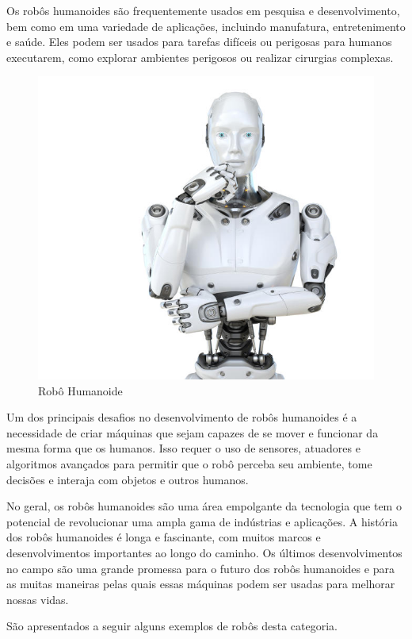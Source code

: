 \documentclass{report}
\begin{document}
Os robôs humanoides são frequentemente usados em pesquisa e desenvolvimento, bem como em uma variedade de aplicações, incluindo manufatura, entretenimento e saúde. Eles podem ser usados para tarefas difíceis ou perigosas para humanos executarem, como explorar ambientes perigosos ou realizar cirurgias complexas.

\begin{figure}
\includegraphics[width=0.9\linewidth]{robo.png} 
\caption{Robô Humanoide}
\label{robohumanoide}
\end{figure}

Um dos principais desafios no desenvolvimento de robôs humanoides é a necessidade de criar máquinas que sejam capazes de se mover e funcionar da mesma forma que os humanos. Isso requer o uso de sensores, atuadores e algoritmos avançados para permitir que o robô perceba seu ambiente, tome decisões e interaja com objetos e outros humanos.

No geral, os robôs humanoides são uma área empolgante da tecnologia que tem o potencial de revolucionar uma ampla gama de indústrias e aplicações. A história dos robôs humanoides é longa e fascinante, com muitos marcos e desenvolvimentos importantes ao longo do caminho. Os últimos desenvolvimentos no campo são uma grande promessa para o futuro dos robôs humanoides e para as muitas maneiras pelas quais essas máquinas podem ser usadas para melhorar nossas vidas.

São apresentados a seguir alguns exemplos de robôs desta categoria.
\end{document}
